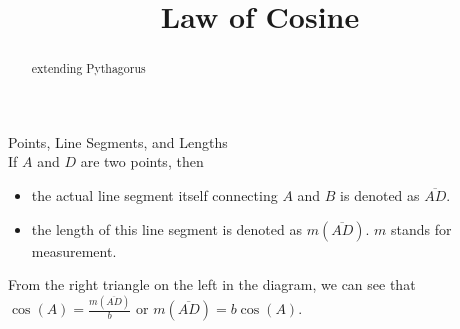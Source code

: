 \documentclass{ximera}
\title{Law of Cosine}
\begin{document}
\begin{abstract}
extending Pythagorus
\end{abstract}
\maketitle












\begin{image}[3in]
  \end{image}




\begin{notation} Points, Line Segments, and Lengths \\

If $A$ and $D$ are two points, then 

\begin{itemize}
\item the actual line segment itself connecting $A$ and $B$ is denoted as $\overline{AD}$. 
\item the length of this line segment is denoted as $m(\overline{AD})$.  $m$ stands for measurement.
\end{itemize}
\end{notation}




From the right triangle on the left in the diagram, we can see that $\cos(A) = \frac{m(\overline{AD})}{b}$ or $m(\overline{AD}) = b \cos(A)$.
\end{document}
